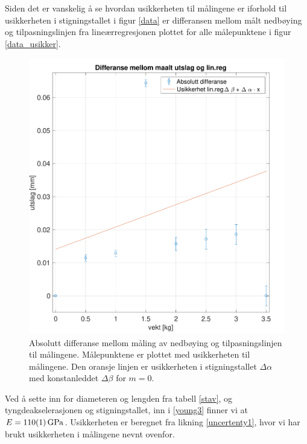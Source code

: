 \documentclass[%
 reprint,
 amsmath,amssymb,
 aps,
 norsk,
 booktabs
]{revtex4-1}
\begin{document}
Siden det er vanskelig å se hvordan usikkerheten til målingene er iforhold til usikkerheten i stigningstallet i figur \vref{data} er differansen mellom målt nedbøying og tilpasningslinjen fra lineærregresjonen plottet for alle målepunktene i figur \vref{data_usikker}.
\begin{figure}[h!]
  \centering
  \includegraphics[scale=0.4]{usikkerhet_c.pdf}
  \caption{Absolutt differanse mellom måling av nedbøying og tilpasningslinjen til målingene. Målepunktene er plottet med usikkerheten til målingene. Den oransje linjen er usikkerheten i stigningstallet $\Delta \alpha$ med konstanleddet $\Delta \beta$ for $m=0$.}
  \label{data_usikker}
\end{figure}
Ved å sette inn for diameteren og lengden fra tabell \vref{stav}, og tyngdeakselerasjonen og stigningstallet, inn i \eqref{young3} finner vi at $E=\SI{110\pm1}{\giga\pascal}$. Usikkerheten er beregnet fra likning \eqref{uncertenty1}, hvor vi har brukt usikkerheten i målingene nevnt ovenfor.
\end{document}
